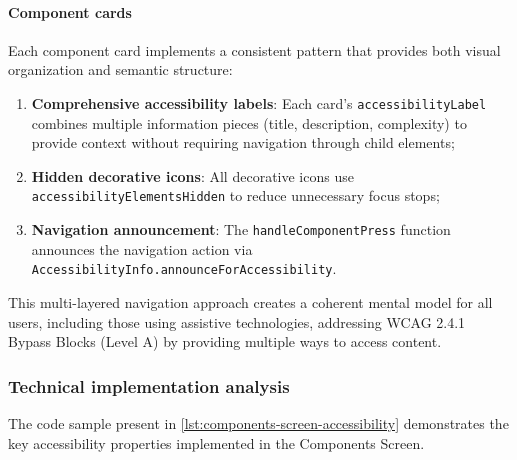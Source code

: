 \pagebreak

\paragraph{Component cards}

Each component card implements a consistent pattern that provides both visual organization and semantic structure:

\begin{enumerate}
    \item \textbf{Comprehensive accessibility labels}: Each card's \texttt{accessibilityLabel} combines multiple information pieces (title, description, complexity) to provide context without requiring navigation through child elements;
    
    \item \textbf{Hidden decorative icons}: All decorative icons use \texttt{accessibilityElementsHidden} to reduce unnecessary focus stops;
    
    \item \textbf{Navigation announcement}: The \texttt{handleComponentPress} function announces the navigation action via \texttt{AccessibilityInfo.announceForAccessibility}.
\end{enumerate}

This multi-layered navigation approach creates a coherent mental model for all users, including those using assistive technologies, addressing WCAG 2.4.1 Bypass Blocks (Level A) by providing multiple ways to access content.

\subsubsection{Technical implementation analysis}

The code sample present in \ref{lst:components-screen-accessibility} demonstrates the key accessibility properties implemented in the Components Screen.

